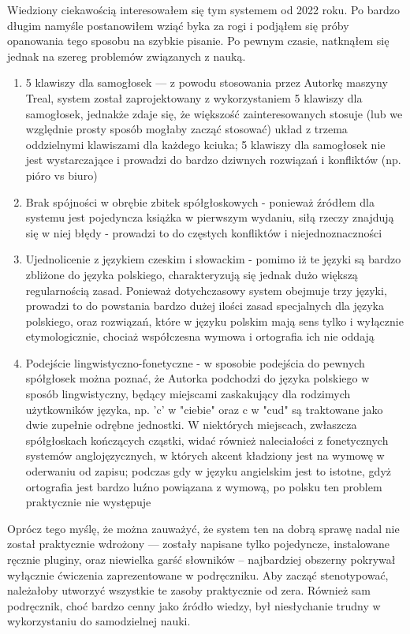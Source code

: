 \documentclass[12p, oneside]{book}
\begin{document}
Wiedziony ciekawością interesowałem się tym systemem od 2022 roku. Po bardzo
długim namyśle postanowiłem wziąć byka za rogi i podjąłem się próby opanowania
tego sposobu na szybkie pisanie. Po pewnym czasie, natknąłem się jednak na
szereg problemów związanych z nauką.
\begin{enumerate}
	\item 5 klawiszy dla samogłosek --- z powodu stosowania przez Autorkę
		maszyny Treal, system został zaprojektowany z wykorzystaniem
		5 klawiszy dla samogłosek, jednakże zdaje się, że większość
		zainteresowanych stosuje (lub we względnie prosty sposób mogłaby
		zacząć stosować) układ z trzema oddzielnymi klawiszami dla
		każdego kciuka; 5 klawiszy dla samogłosek nie jest wystarczające
		i prowadzi do bardzo dziwnych rozwiązań i konfliktów (np. pióro
		vs biuro)
	\item Brak spójności w obrębie zbitek spółgłoskowych - ponieważ źródłem
		dla systemu jest pojedyncza książka w pierwszym wydaniu, siłą
		rzeczy znajdują się w niej błędy - prowadzi to do częstych
		konfliktów i niejednoznaczności
	\item Ujednolicenie z językiem czeskim i słowackim - pomimo iż te języki
		są bardzo zbliżone do języka polskiego, charakteryzują
		się jednak dużo większą regularnością zasad. Ponieważ dotychczasowy
		system obejmuje trzy języki, prowadzi to do powstania bardzo
		dużej ilości zasad specjalnych dla języka polskiego, oraz
		rozwiązań, które w języku polskim mają sens tylko i wyłącznie
		etymologicznie, chociaż współczesna wymowa i ortografia ich nie
		oddają
	\item Podejście lingwistyczno-fonetyczne - w sposobie podejścia do
		pewnych spółgłosek można poznać, że Autorka podchodzi do języka
		polskiego w sposób lingwistyczny, będący miejscami zaskakujący
		dla rodzimych użytkowników języka, np. 'c' w "ciebie" oraz c w
		"cud" są traktowane jako dwie zupełnie odrębne jednostki. W
		niektórych miejscach, zwłaszcza spółgłoskach kończących cząstki,
		widać również naleciałości z fonetycznych systemów
		anglojęzycznych, w których akcent kładziony jest na wymowę w
		oderwaniu od zapisu; podczas gdy w języku angielskim jest to
		istotne, gdyż ortografia jest bardzo luźno powiązana z wymową,
		po polsku ten problem praktycznie nie występuje
\end{enumerate}
Oprócz tego myślę, że można zauważyć, że system ten na dobrą sprawę nadal nie
został praktycznie wdrożony --- zostały napisane tylko pojedyncze, instalowane
ręcznie pluginy, oraz niewielka garść słowników -- najbardziej obszerny pokrywał
wyłącznie ćwiczenia zaprezentowane w podręczniku. Aby zacząć stenotypować,
należałoby utworzyć wszystkie te zasoby praktycznie od zera. Również sam
podręcznik, choć bardzo cenny jako źródło wiedzy, był niesłychanie trudny w
wykorzystaniu do samodzielnej nauki.
\end{document}
